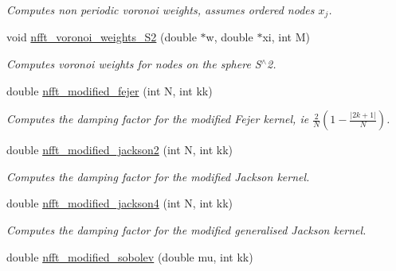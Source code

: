 \begin{CompactItemize}
\begin{CompactList}\small\item\em Computes non periodic voronoi weights, assumes ordered nodes $x_j$. \item\end{CompactList}\item 
void \hyperlink{group__nfftutil_g26a4ed487a23e99e01f111113be9f994}{nfft\_\-voronoi\_\-weights\_\-S2} (double $\ast$w, double $\ast$xi, int M)
\begin{CompactList}\small\item\em Computes voronoi weights for nodes on the sphere S$^\wedge$2. \item\end{CompactList}\item 
\hypertarget{group__nfftutil_gc9b810183abafb668f8aa777c7985256}{
double \hyperlink{group__nfftutil_gc9b810183abafb668f8aa777c7985256}{nfft\_\-modified\_\-fejer} (int N, int kk)}
\label{group__nfftutil_gc9b810183abafb668f8aa777c7985256}

\begin{CompactList}\small\item\em Computes the damping factor for the modified Fejer kernel, ie $\frac{2}{N}\left(1-\frac{\left|2k+1\right|}{N}\right)$. \item\end{CompactList}\item 
\hypertarget{group__nfftutil_gb45a6cd3528d3716522a0cf184375aaf}{
double \hyperlink{group__nfftutil_gb45a6cd3528d3716522a0cf184375aaf}{nfft\_\-modified\_\-jackson2} (int N, int kk)}
\label{group__nfftutil_gb45a6cd3528d3716522a0cf184375aaf}

\begin{CompactList}\small\item\em Computes the damping factor for the modified Jackson kernel. \item\end{CompactList}\item 
\hypertarget{group__nfftutil_g126ec2282393435f0d795ac79db8654b}{
double \hyperlink{group__nfftutil_g126ec2282393435f0d795ac79db8654b}{nfft\_\-modified\_\-jackson4} (int N, int kk)}
\label{group__nfftutil_g126ec2282393435f0d795ac79db8654b}

\begin{CompactList}\small\item\em Computes the damping factor for the modified generalised Jackson kernel. \item\end{CompactList}\item 
\hypertarget{group__nfftutil_ga84cb34c6d368599fb2f997eadb184a7}{
double \hyperlink{group__nfftutil_ga84cb34c6d368599fb2f997eadb184a7}{nfft\_\-modified\_\-sobolev} (double mu, int kk)}
\label{group__nfftutil_ga84cb34c6d368599fb2f997eadb184a7}


\end{CompactItemize}
